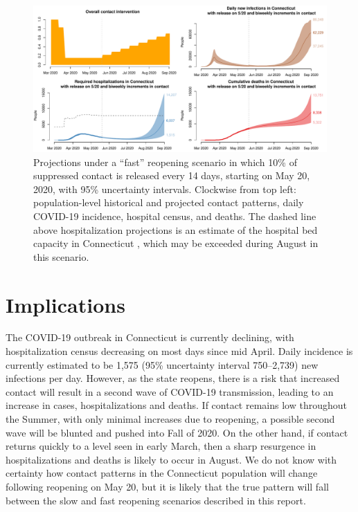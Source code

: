 \documentclass[11pt]{article}
\begin{document}
\begin{figure}
\centering
\includegraphics[width=\textwidth]{figures/fast.pdf}
\caption{Projections under a ``fast'' reopening scenario in which 10\% of suppressed contact is released every 14 days, starting on May 20, 2020, with 95\% uncertainty intervals.  Clockwise from top left: population-level historical and projected contact patterns, daily COVID-19 incidence, hospital census, and deaths. The dashed line above hospitalization projections is an estimate of the hospital bed capacity in Connecticut \citep{CHAwebsite}, which may be exceeded during August in this scenario. }
\label{fig:fast}
\end{figure}








\section*{Implications}

The COVID-19 outbreak in Connecticut is currently declining, with hospitalization census decreasing on most days since mid April.  Daily incidence is currently estimated to be 1,575 (95\% uncertainty interval 750--2,739) new infections per day.  However, as the state reopens, there is a risk that increased contact will result in a second wave of COVID-19 transmission, leading to an increase in cases, hospitalizations and deaths. If contact remains low throughout the Summer, with only minimal increases due to reopening, a possible second wave will be blunted and pushed into Fall of 2020.  On the other hand, if contact returns quickly to a level seen in early March, then a sharp resurgence in hospitalizations and deaths is likely to occur in August.  We do not know with certainty how contact patterns in the Connecticut population will change following reopening on May 20, but it is likely that the true pattern will fall between the slow and fast reopening scenarios described in this report.  
\end{document}

